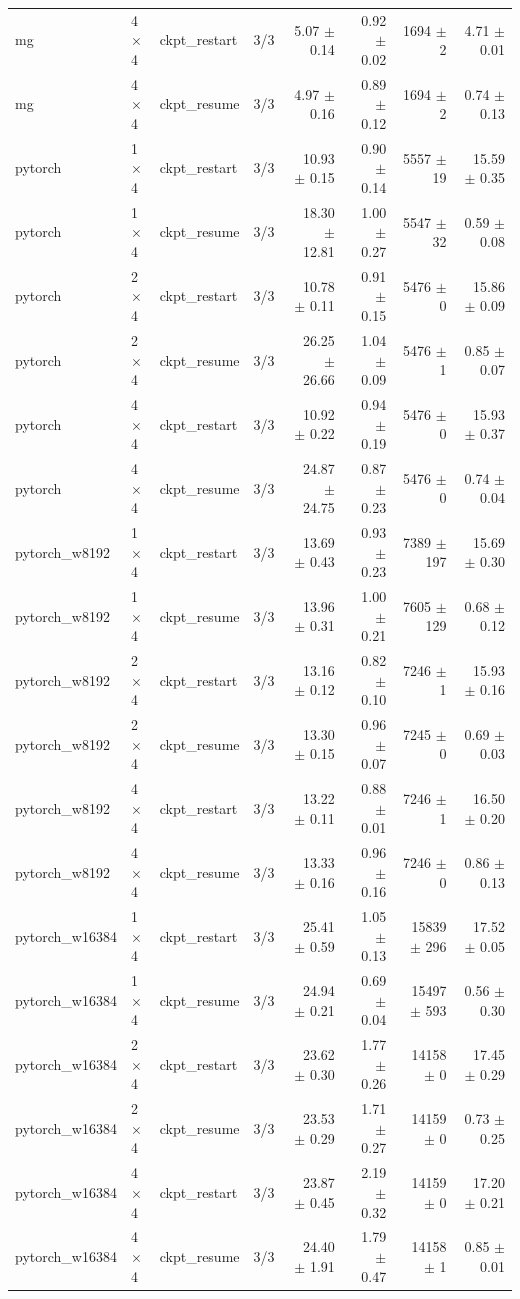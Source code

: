 \begin{tabular}{lllrrrrr}
mg & 4$\times$4 & ckpt\_restart & 3/3 & 5.07 $\pm$ 0.14 & 0.92 $\pm$ 0.02 & 1694 $\pm$ 2 & 4.71 $\pm$ 0.01 \\
mg & 4$\times$4 & ckpt\_resume & 3/3 & 4.97 $\pm$ 0.16 & 0.89 $\pm$ 0.12 & 1694 $\pm$ 2 & 0.74 $\pm$ 0.13 \\
pytorch & 1$\times$4 & ckpt\_restart & 3/3 & 10.93 $\pm$ 0.15 & 0.90 $\pm$ 0.14 & 5557 $\pm$ 19 & 15.59 $\pm$ 0.35 \\
pytorch & 1$\times$4 & ckpt\_resume & 3/3 & 18.30 $\pm$ 12.81 & 1.00 $\pm$ 0.27 & 5547 $\pm$ 32 & 0.59 $\pm$ 0.08 \\
pytorch & 2$\times$4 & ckpt\_restart & 3/3 & 10.78 $\pm$ 0.11 & 0.91 $\pm$ 0.15 & 5476 $\pm$ 0 & 15.86 $\pm$ 0.09 \\
pytorch & 2$\times$4 & ckpt\_resume & 3/3 & 26.25 $\pm$ 26.66 & 1.04 $\pm$ 0.09 & 5476 $\pm$ 1 & 0.85 $\pm$ 0.07 \\
pytorch & 4$\times$4 & ckpt\_restart & 3/3 & 10.92 $\pm$ 0.22 & 0.94 $\pm$ 0.19 & 5476 $\pm$ 0 & 15.93 $\pm$ 0.37 \\
pytorch & 4$\times$4 & ckpt\_resume & 3/3 & 24.87 $\pm$ 24.75 & 0.87 $\pm$ 0.23 & 5476 $\pm$ 0 & 0.74 $\pm$ 0.04 \\
pytorch\_w8192 & 1$\times$4 & ckpt\_restart & 3/3 & 13.69 $\pm$ 0.43 & 0.93 $\pm$ 0.23 & 7389 $\pm$ 197 & 15.69 $\pm$ 0.30 \\
pytorch\_w8192 & 1$\times$4 & ckpt\_resume & 3/3 & 13.96 $\pm$ 0.31 & 1.00 $\pm$ 0.21 & 7605 $\pm$ 129 & 0.68 $\pm$ 0.12 \\
pytorch\_w8192 & 2$\times$4 & ckpt\_restart & 3/3 & 13.16 $\pm$ 0.12 & 0.82 $\pm$ 0.10 & 7246 $\pm$ 1 & 15.93 $\pm$ 0.16 \\
pytorch\_w8192 & 2$\times$4 & ckpt\_resume & 3/3 & 13.30 $\pm$ 0.15 & 0.96 $\pm$ 0.07 & 7245 $\pm$ 0 & 0.69 $\pm$ 0.03 \\
pytorch\_w8192 & 4$\times$4 & ckpt\_restart & 3/3 & 13.22 $\pm$ 0.11 & 0.88 $\pm$ 0.01 & 7246 $\pm$ 1 & 16.50 $\pm$ 0.20 \\
pytorch\_w8192 & 4$\times$4 & ckpt\_resume & 3/3 & 13.33 $\pm$ 0.16 & 0.96 $\pm$ 0.16 & 7246 $\pm$ 0 & 0.86 $\pm$ 0.13 \\
pytorch\_w16384 & 1$\times$4 & ckpt\_restart & 3/3 & 25.41 $\pm$ 0.59 & 1.05 $\pm$ 0.13 & 15839 $\pm$ 296 & 17.52 $\pm$ 0.05 \\
pytorch\_w16384 & 1$\times$4 & ckpt\_resume & 3/3 & 24.94 $\pm$ 0.21 & 0.69 $\pm$ 0.04 & 15497 $\pm$ 593 & 0.56 $\pm$ 0.30 \\
pytorch\_w16384 & 2$\times$4 & ckpt\_restart & 3/3 & 23.62 $\pm$ 0.30 & 1.77 $\pm$ 0.26 & 14158 $\pm$ 0 & 17.45 $\pm$ 0.29 \\
pytorch\_w16384 & 2$\times$4 & ckpt\_resume & 3/3 & 23.53 $\pm$ 0.29 & 1.71 $\pm$ 0.27 & 14159 $\pm$ 0 & 0.73 $\pm$ 0.25 \\
pytorch\_w16384 & 4$\times$4 & ckpt\_restart & 3/3 & 23.87 $\pm$ 0.45 & 2.19 $\pm$ 0.32 & 14159 $\pm$ 0 & 17.20 $\pm$ 0.21 \\
pytorch\_w16384 & 4$\times$4 & ckpt\_resume & 3/3 & 24.40 $\pm$ 1.91 & 1.79 $\pm$ 0.47 & 14158 $\pm$ 1 & 0.85 $\pm$ 0.01 \\
\bottomrule
\end{tabular}
